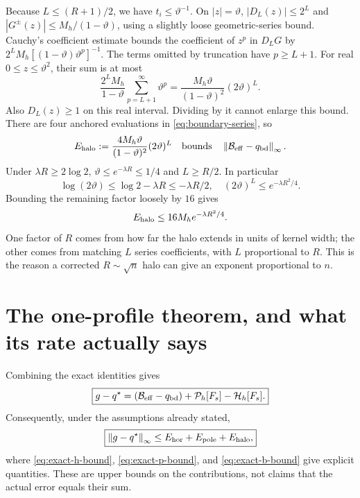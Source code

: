 \documentclass[11pt]{article}
\newcommand{\norm}[1]{\left\lVert#1\right\rVert}
\begin{document}
Because $L\le(R+1)/2$, we have $t_i\le\vartheta^{-1}$. On $|z|=\vartheta$,
$|D_L(z)|\le2^L$ and $|G^\pm(z)|\le M_h/(1-\vartheta)$, using a slightly loose geometric-series bound. Cauchy's coefficient estimate bounds the coefficient of $z^p$ in $D_LG$ by
$2^LM_h[(1-\vartheta)\vartheta^p]^{-1}$. The terms omitted by truncation have $p\ge L+1$. For real $0\le z\le\vartheta^2$, their sum is at most
\[
 \frac{2^LM_h}{1-\vartheta}\sum_{p=L+1}^{\infty}\vartheta^p
 =\frac{M_h\vartheta}{(1-\vartheta)^2}(2\vartheta)^L.
\]
Also $D_L(z)\ge1$ on this real interval. Dividing by it cannot enlarge this bound. There are four anchored evaluations in \eqref{eq:boundary-series}, so
\begin{equation}
 E_{\rm halo}:=
 \frac{4M_h\vartheta}{(1-\vartheta)^2}(2\vartheta)^L
 \quad\text{bounds}\quad
 \norm{\mathcal B_{\rm eff}-q_{\rm bd}}_\infty.
 \label{eq:exact-b-bound}
\end{equation}
Under $\lambda R\ge2\log2$, $\vartheta\le e^{-\lambda R}\le1/4$ and $L\ge R/2$. In particular
\[
 \log(2\vartheta)\le\log2-\lambda R\le-\lambda R/2,
 \quad (2\vartheta)^L\le e^{-\lambda R^2/4}.
\]
Bounding the remaining factor loosely by $16$ gives
\begin{equation}
 E_{\rm halo}\le16M_h e^{-\lambda R^2/4}.
 \label{eq:halo-simplified}
\end{equation}
One factor of $R$ comes from how far the halo extends in units of kernel width; the other comes from matching $L$ series coefficients, with $L$ proportional to $R$. This is the reason a corrected $R\sim\sqrt n$ halo can give an exponent proportional to $n$.

\section{The one-profile theorem, and what its rate actually says}

Combining the exact identities gives
\begin{equation}
 \boxed{g-q^\star=(\mathcal B_{\rm eff}-q_{\rm bd})+
 \mathcal P_h[F_s]-\mathcal H_h[F_s].}
 \label{eq:exact-corrected-error}
\end{equation}
Consequently, under the assumptions already stated,
\begin{equation}
 \boxed{\norm{g-q^\star}_\infty\le E_{\rm hor}+E_{\rm pole}+E_{\rm halo},}
 \label{eq:three-errors}
\end{equation}
where \eqref{eq:exact-h-bound}, \eqref{eq:exact-p-bound}, and \eqref{eq:exact-b-bound} give explicit quantities. These are upper bounds on the contributions, not claims that the actual error equals their sum.
\end{document}
